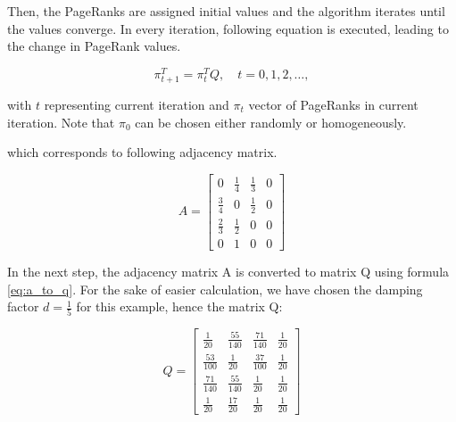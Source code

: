 \begin{example}
Then, the PageRanks are assigned initial values and the algorithm iterates until the values converge. In every iteration, following equation is executed, leading to the change in PageRank values.

\begin{equation*}
\pi_{t+1}^T = \pi_t^TQ,\quad t= 0, 1, 2, \dots,
\end{equation*}

with $t$ representing current iteration and $\pi_t$ vector of PageRanks in current iteration. Note that $\pi_0$ can be chosen either randomly or homogeneously.

\vspace{1em}
\begin{figure}[H]
\centering
{}
\end{figure}

\noindent which corresponds to following adjacency matrix.

\[
\renewcommand\arraystretch{1.5}
A = 
\begin{bmatrix}
0 & \frac{1}{4} & \frac{1}{3} & 0 \\
\frac{3}{4} & 0 & \frac{1}{2} & 0 \\
\frac{2}{3} & \frac{1}{2} & 0 & 0 \\
0 & 1 & 0 &0
\end{bmatrix}
\]  

In the next step, the adjacency matrix A is converted to matrix Q using formula \eqref{eq:a_to_q}. For the sake of easier calculation, we have chosen the damping factor $d = \frac{1}{5}$ for this example, hence the matrix Q:

\[
\renewcommand\arraystretch{1.5}
Q = 
\begin{bmatrix}
\frac{1}{20} & \frac{55}{140} & \frac{71}{140} & \frac{1}{20} \\
\frac{53}{100} & \frac{1}{20} & \frac{37}{100} & \frac{1}{20} \\
\frac{71}{140} & \frac{55}{140} & \frac{1}{20} & \frac{1}{20} \\
\frac{1}{20} & \frac{17}{20} & \frac{1}{20} & \frac{1}{20}
\end{bmatrix}
\]


\end{example}
